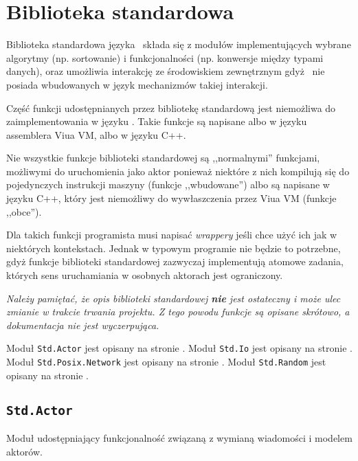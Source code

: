 \section{Biblioteka standardowa}

Biblioteka standardowa języka \ViuAct\ składa się z modułów implementujących
wybrane algorytmy (np. sortowanie) i funkcjonalności (np. konwersje między
typami danych), oraz umożliwia interakcję ze środowiskiem zewnętrznym gdyż
\ViuAct\ nie posiada wbudowanych w język mechanizmów takiej interakcji.

Część funkcji udostępnianych przez bibliotekę standardową jest niemożliwa do zaimplementowania w języku
\ViuAct. Takie funkcje są napisane albo w języku assemblera Viua VM, albo w języku C++.

Nie wszystkie funkcje biblioteki standardowej są ,,normalnymi'' funkcjami, możliwymi do uruchomienia jako
aktor ponieważ niektóre z nich kompilują się do pojedynczych instrukcji maszyny (funkcje ,,wbudowane'') albo
są napisane w języku C++, który jest niemożliwy do wywłaszczenia przez Viua VM (funkcje ,,obce'').

Dla takich funkcji programista musi napisać \emph{wrappery} jeśli chce użyć ich jak w niektórych kontekstach.
Jednak w typowym programie nie będzie to potrzebne, gdyż funkcje biblioteki standardowej zazwyczaj
implementują atomowe zadania, których sens uruchamiania w osobnych aktorach jest ograniczony.

\begin{center}
\emph{Należy pamiętać, że opis biblioteki standardowej \textbf{nie} jest ostateczny i może ulec zmianie w
trakcie trwania projektu. Z tego powodu funkcje są opisane skrótowo, a dokumentacja nie jest wyczerpująca.}
\end{center}

Moduł \texttt{Std.Actor} jest opisany na stronie \pageref{stdlib_Std_Actor}.
Moduł \texttt{Std.Io} jest opisany na stronie \pageref{stdlib_Std_Io}.
Moduł \texttt{Std.Posix.Network} jest opisany na stronie \pageref{stdlib_Std_Posix_Network}.
Moduł \texttt{Std.Random} jest opisany na stronie \pageref{stdlib_Std_Random}.

\subsection{\texttt{Std.Actor}}
\label{stdlib_Std_Actor}

Moduł udostępniający funkcjonalność związaną z wymianą wiadomości i modelem aktorów.

